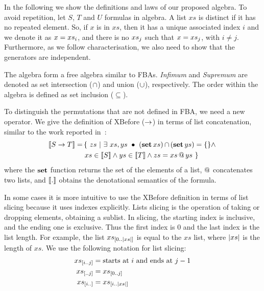 
In the following we show the definitions and laws of our proposed \ac{algebra}.
To avoid repetition, let $S$, $T$ and $U$ formulas in \ac{algebra}.
A list $xs$ is distinct if it has no repeated element.
So, if $x$ is in $xs$, then it has a unique associated index $i$ and we denote it as $x = xs_{i}$, and there is no $xs_{j}$ such that $x=xs_{j}$, with $i \neq j$.
Furthermore, as we follow  characterisation, we also need to show that the generators are independent.

The \ac{algebra} form a free algebra similar to \acp{FBA}.
\emph{Infimum} and \emph{Supremum} are denoted as set intersection ($\operatorname{\cap}$) and union ($\operatorname{\cup}$), respectively.
The order within the algebra is defined as set inclusion ($\subseteq$).

To distinguish the permutations that are not defined in \ac{FBA}, we need a new operator.
We give the definition of \ac{XBefore} ($\rightarrow$) in terms of list concatenation, similar to the work reported in~\cite{DM2015}:
%
\begin{align}
\left[\!\left[S \rightarrow T\right]\!\right] = &
  \left\{~
    zs ~\middle|~ \exists~ xs, ys ~\bullet~ \left( \operatorname{\mathbf{set}} xs \right) \operatorname{\cap} \left( \operatorname{\mathbf{set}} ys \right) = \{\} \land \right.\nonumber\\
  & \left. xs \in \left[\!\left[S\right]\!\right] \land ys \in \left[\!\left[T\right]\!\right] \land zs = xs \operatorname{\mathbf{@}} ys
  ~\right\}\label{def:xbefore-append}
\end{align}
%
where the $\operatorname{\mathbf{set}}$ function returns the set of the elements of a list, $\operatorname{\mathbf{@}}$ concatenates two lists, and $\left[\!\left[.\right]\!\right]$ obtains the denotational semantics of the formula.

In some cases it is more intuitive to use the \ac{XBefore} definition in terms of list slicing because it uses indexes explicitly.
Lists slicing is the operation of taking or dropping elements, obtaining a sublist.
In slicing, the starting index is inclusive, and the ending one is exclusive.
Thus the first index is 0 and the last index is the list length.
For example, the list $xs_{\left[0..\left|xs\right|\right]}$ is equal to the $xs$ list, where $\left|xs\right|$ is the length of $xs$.
We use the following notation for list slicing:
%
\begin{subequations}
\begin{align}
xs_{\left[i..j\right]} &= \text{starts at $i$ and ends at $j-1$}\label{def:slice}\\
xs_{\left[..j\right]} &= xs_{\left[0..j\right]}\label{def:slice-right}\\
xs_{\left[i..\right]} &= xs_{\left[i..\left|xs\right|\right]}\label{def:slice-left}
\end{align}
\end{subequations}

